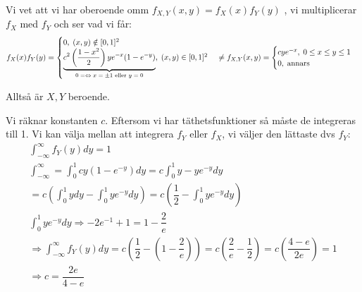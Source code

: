 \par\bigskip
\noindent Vi vet att vi har oberoende omm $f_{X,Y}(x,y) = f_X(x)f_Y(y)$ , vi multiplicerar $f_X$ med $f_Y$ och ser vad vi får:
\begin{equation*}
  \begin{gathered}
    f_X(x)f_Y(y)= \begin{cases}0,\; (x,y)\notin[0,1]^2\\\underbrace{c^2\left(\dfrac{1-x^2}{2}\right)ye^{-x}(1-e^{-y})}_{\text{$0=\Leftrightarrow x =\pm1$ eller $y=0$}},\; (x,y)\in[0,1]^2\end{cases}\neq f_{X,Y} (x,y) = \begin{cases}cye^{-x},\;0\leq x\leq y\leq1\\0,\;\text{annars}\end{cases}
  \end{gathered}
\end{equation*}
\par\bigskip
\noindent Alltså är $X,Y$ beroende.
\par\bigskip
\noindent Vi räknar konstanten $c$. Eftersom vi har täthetsfunktioner så måste de integreras till 1. Vi kan välja mellan att integrera $f_Y$ eller $f_X$, vi väljer den lättaste dvs $f_Y$:
\begin{equation*}
  \begin{gathered}
    \int_{-\infty}^{\infty}f_Y(y)dy =1\\
    \int_{-\infty}^{\infty} = \int_{0}^{1}cy(1-e^{-y})dy = c\int_{0}^{1}y-ye^{-y}dy\\
    = c\left(\int_{0}^{1}ydy-\int_{0}^{1}ye^{-y}dy\right) = c\left(\dfrac{1}{2}-\int_{0}^{1}ye^{-y}dy\right)\\
    \int_{0}^{1}ye^{-y}dy\Rightarrow -2e^{-1}+1 = 1-\dfrac{2}{e}\\
    \Rightarrow \int_{-\infty}^{\infty}f_Y(y)dy = c\left(\dfrac{1}{2}-\left(1-\dfrac{2}{e}\right)\right) = c\left(\dfrac{2}{e}-\dfrac{1}{2}\right) = c\left(\dfrac{4-e}{2e}\right) = 1\\
    \Rightarrow c = \dfrac{2e}{4-e}
  \end{gathered}
\end{equation*}
\par\bigskip
